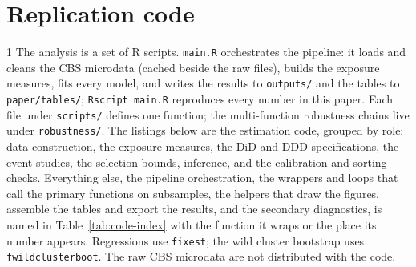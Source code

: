 \section{Replication code}\label{sec:app-code}
\begin{spacing}{1}
\noindent The analysis is a set of R scripts. \texttt{main.R} orchestrates the pipeline: it loads and
cleans the CBS microdata (cached beside the raw files), builds the exposure measures, fits every
model, and writes the results to \texttt{outputs/} and the tables to \texttt{paper/tables/};
\texttt{Rscript main.R} reproduces every number in this paper. Each file under
\texttt{scripts/} defines one function; the multi-function robustness chains live under
\texttt{robustness/}. The listings below are the estimation code, grouped by role: data
construction, the exposure measures, the DiD and DDD specifications, the event studies, the
selection bounds, inference, and the calibration and sorting checks. Everything else, the
pipeline orchestration, the wrappers and loops that call the primary functions on subsamples,
the helpers that draw the figures, assemble the tables and export the results, and the secondary
diagnostics, is named in Table~\ref{tab:code-index} with the function it wraps or the place its
number appears. Regressions use \texttt{fixest}; the wild cluster bootstrap uses
\texttt{fwildclusterboot}. The raw CBS microdata are not distributed with the code.


\end{spacing}
